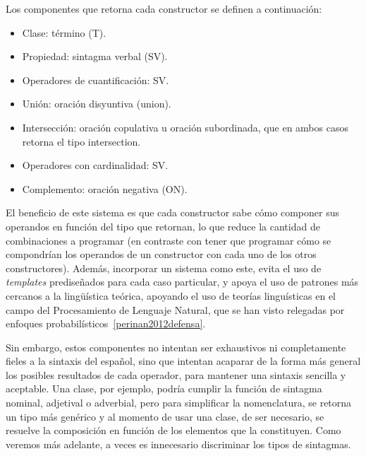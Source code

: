 Los componentes que retorna cada constructor se definen a continuación:
\begin{itemize}
    \item Clase: término (T).
    \item Propiedad: sintagma verbal (SV).
    \item Operadores de cuantificación: SV.
    \item Unión: oración disyuntiva (union).
    \item Intersección: oración copulativa u oración subordinada, que en ambos casos retorna el tipo intersection.%
    \item Operadores con cardinalidad: SV.
    \item Complemento: oración negativa (ON).
\end{itemize}

El beneficio de este sistema es que cada constructor sabe cómo componer sus operandos en función del tipo que retornan, lo que reduce la cantidad de combinaciones a programar (en contraste con tener que programar cómo se compondrían los operandos de un constructor con cada uno de los otros constructores). Además, incorporar un sistema como este, evita el uso de \emph{templates} prediseñados para cada caso particular, y apoya el uso de patrones más cercanos a la lingüística teórica, apoyando el uso de teorías linguísticas en el campo del Procesamiento de Lenguaje Natural, que se han visto relegadas por enfoques probabilísticos~\ref{perinan2012defensa}.


Sin embargo, estos componentes no intentan ser exhaustivos ni completamente fieles a la sintaxis del español, sino que intentan acaparar de la forma más general los posibles resultados de cada operador, para mantener una sintaxis sencilla y aceptable. Una clase, por ejemplo, podría cumplir la función de sintagma nominal, adjetival o adverbial, pero para simplificar la nomenclatura, se retorna un tipo más genérico y al momento de usar una clase, de ser necesario, se resuelve la composición en función de los elementos que la constituyen. Como veremos más adelante, a veces es innecesario discriminar los tipos de sintagmas.


